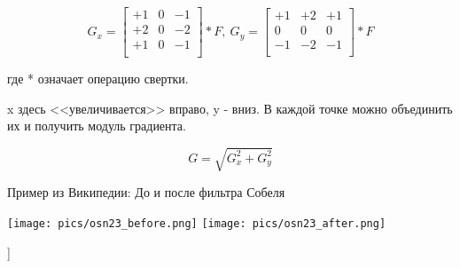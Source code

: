 $$
G_x = 
\begin{bmatrix}
+1 & 0 & -1 \\
+2 & 0 & -2 \\
+1 & 0 & -1 \\
\end{bmatrix}
* F, ~ 
G_y = 
\begin{bmatrix}
+1 & +2 & +1 \\
0  & 0  & 0  \\
-1 & -2 & -1 \\
\end{bmatrix}
* F
$$

где * означает операцию свертки.

x здесь <<увеличивается>> вправо, y - вниз. В каждой точке можно объединить их и получить модуль градиента.

$$G = \sqrt{G_x^2 + G_y^2}$$

Пример из Википедии: До и после фильтра Собеля

\texttt{[image: pics/osn23\_before.png]}
\texttt{[image: pics/osn23\_after.png]}

\bigbreak
[\cite[page 69-96]{replace_me}]